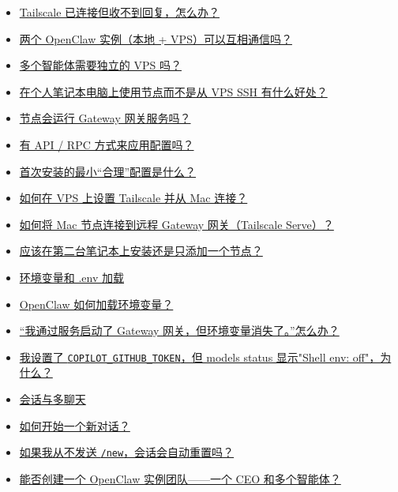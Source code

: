 \begin{itemize}
  \item \href{\#tailscale-is-connected-but-i-get-no-replies-what-now}{Tailscale 已连接但收不到回复，怎么办？}
  \item \href{\#can-two-openclaw-instances-talk-to-each-other-local-vps}{两个 OpenClaw 实例（本地 + VPS）可以互相通信吗？}
  \item \href{\#do-i-need-separate-vpses-for-multiple-agents}{多个智能体需要独立的 VPS 吗？}
  \item \href{\#is-there-a-benefit-to-using-a-node-on-my-personal-laptop-instead-of-ssh-from-a-vps}{在个人笔记本电脑上使用节点而不是从 VPS SSH 有什么好处？}
  \item \href{\#do-nodes-run-a-gateway-service}{节点会运行 Gateway 网关服务吗？}
  \item \href{\#is-there-an-api-rpc-way-to-apply-config}{有 API / RPC 方式来应用配置吗？}
  \item \href{\#whats-a-minimal-sane-config-for-a-first-install}{首次安装的最小“合理”配置是什么？}
  \item \href{\#how-do-i-set-up-tailscale-on-a-vps-and-connect-from-my-mac}{如何在 VPS 上设置 Tailscale 并从 Mac 连接？}
  \item \href{\#how-do-i-connect-a-mac-node-to-a-remote-gateway-tailscale-serve}{如何将 Mac 节点连接到远程 Gateway 网关（Tailscale Serve）？}
  \item \href{\#should-i-install-on-a-second-laptop-or-just-add-a-node}{应该在第二台笔记本上安装还是只添加一个节点？}
  \item \href{\#env-vars-and-env-loading}{环境变量和 .env 加载}
  \item \href{\#how-does-openclaw-load-environment-variables}{OpenClaw 如何加载环境变量？}
  \item \href{\#i-started-the-gateway-via-the-service-and-my-env-vars-disappeared-what-now}{“我通过服务启动了 Gateway 网关，但环境变量消失了。”怎么办？}
  \item \href{\#i-set-copilotgithubtoken-but-models-status-shows-shell-env-off-why}{我设置了 \texttt{COPILOT\_GITHUB\_TOKEN}，但 models status 显示"Shell env: off"，为什么？}
  \item \href{\#sessions-multiple-chats}{会话与多聊天}
  \item \href{\#how-do-i-start-a-fresh-conversation}{如何开始一个新对话？}
  \item \href{\#do-sessions-reset-automatically-if-i-never-send-new}{如果我从不发送 \texttt{/new}，会话会自动重置吗？}
  \item \href{\#is-there-a-way-to-make-a-team-of-openclaw-instances-one-ceo-and-many-agents}{能否创建一个 OpenClaw 实例团队——一个 CEO 和多个智能体？}

\end{itemize}
